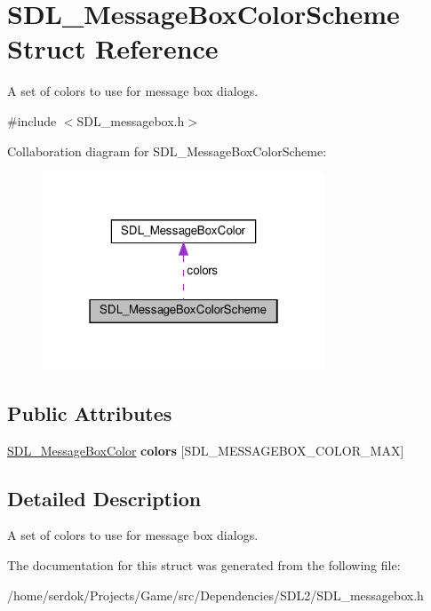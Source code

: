 \hypertarget{structSDL__MessageBoxColorScheme}{}\section{S\+D\+L\+\_\+\+Message\+Box\+Color\+Scheme Struct Reference}
\label{structSDL__MessageBoxColorScheme}


A set of colors to use for message box dialogs.  




{\ttfamily \#include $<$S\+D\+L\+\_\+messagebox.\+h$>$}



Collaboration diagram for S\+D\+L\+\_\+\+Message\+Box\+Color\+Scheme\+:\nopagebreak
\begin{figure}[H]
\begin{center}
\leavevmode
\includegraphics[width=238pt]{structSDL__MessageBoxColorScheme__coll__graph}
\end{center}
\end{figure}
\subsection*{Public Attributes}
\begin{DoxyCompactItemize}
\item 
\mbox{\label{structSDL__MessageBoxColorScheme_ae3712ec81e41b63b781b7d49d3b3b8f6}} 
\hyperlink{structSDL__MessageBoxColor}{S\+D\+L\+\_\+\+Message\+Box\+Color} {\bfseries colors} \mbox{[}S\+D\+L\+\_\+\+M\+E\+S\+S\+A\+G\+E\+B\+O\+X\+\_\+\+C\+O\+L\+O\+R\+\_\+\+M\+AX\mbox{]}
\end{DoxyCompactItemize}


\subsection{Detailed Description}
A set of colors to use for message box dialogs. 

The documentation for this struct was generated from the following file\+:\begin{DoxyCompactItemize}
\item 
/home/serdok/\+Projects/\+Game/src/\+Dependencies/\+S\+D\+L2/S\+D\+L\+\_\+messagebox.\+h\end{DoxyCompactItemize}
